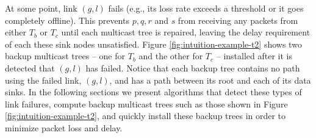 At some point, link $(g,l)$ fails (e.g., its loss rate exceeds a threshold or it goes completely offline).
This prevents $p,q,r$ and $s$ from receiving any packets from either $T_b$ or $T_c$ until each multicast tree is repaired, leaving the delay requirement of each these sink nodes unsatisfied. 
Figure \ref{fig:intuition-example-t2} shows two backup multicast trees -- one for $T_b$ and the other for $T_c$ --
installed after it is detected that $(g,l)$ has failed.
Notice that each backup tree contains no path using the failed link, $(g,l)$, and has a path between its root and each of its data sinks.
In the following sections we present algorithms that detect these types of link failures, compute backup multicast trees such as those shown in Figure \ref{fig:intuition-example-t2}, 
and quickly install these backup trees in order to minimize packet loss and delay.



